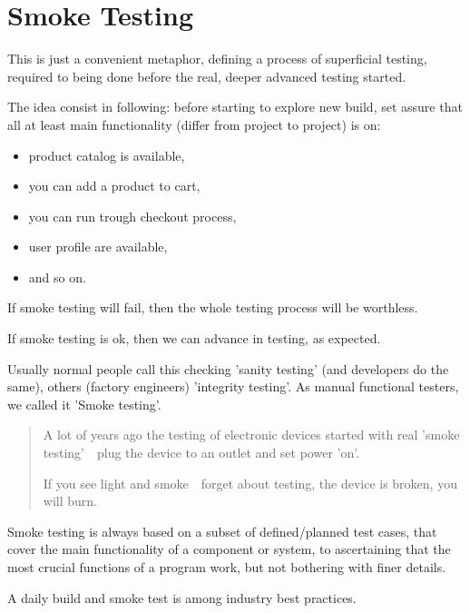 \section{Smoke Testing}
\label{sec:Smoke Testing}

This is just a convenient metaphor, defining a process of superficial testing, required to being done before the real, deeper advanced testing started.

The idea consist in following: before starting to explore new build, set assure that all at least main functionality (differ from project to project) is on:

    \begin{itemize}
\item 
product catalog is available,
\item     you can add a product to cart,
\item     you can run trough checkout process,
\item     user profile are available,
\item     and so on.
\end{itemize}

If smoke testing will fail, then the whole testing process will be worthless.

If smoke testing is ok, then we can advance in testing, as expected.

Usually normal people call this checking 'sanity testing' (and developers do the same), others (factory engineers) 'integrity testing'. As manual functional testers, we called it 'Smoke testing'.

\begin{quote}
A lot of years ago the testing of electronic devices started with real 'smoke testing'~\textemdash~plug the device to an outlet and set power 'on'.

If you see light and smoke~\textemdash~forget about testing, the device is broken, you will burn.                                                                        \end{quote} 

Smoke testing is always based on a subset of defined/planned test cases, that cover the main functionality of a component or system, to ascertaining that the most crucial functions of a program work, but not bothering with finer details.

A daily build and smoke test is among industry best practices.
